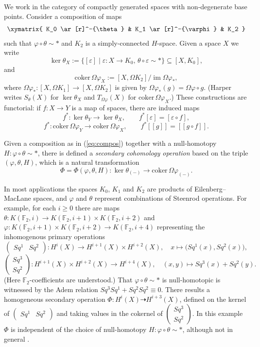\documentclass{amsart}
\theoremstyle{plain}
\theoremstyle{definition}
\def\ker{\operatorname{ker}}
\def\coker{\mathrm{coker}}
\newcommand{\F}{\mathbb{F}}
\begin{document}
We work in the category of compactly generated spaces with non-degenerate base points. Consider a composition of maps
\begin{equation}\label{eq:compos}
\xymatrix{
K_0 \ar[r]^-{\theta} & K_1 \ar[r]^-{\varphi} & K_2
}
\end{equation}
such that $\varphi\circ\theta\sim \ast$ and $K_2$ is a simply-connected $H$-space. Given a space $X$ we write
\[
\ker \theta_X:=\{ [\varepsilon] \mid \varepsilon: X\to K_0,\, \theta\circ\varepsilon \sim \ast\} \subseteq [X, K_0],
\]
and 
\[
\coker\, \Omega\varphi_X:=[X,\Omega K_2]/\operatorname{im} \Omega\varphi_*,
\]
where $\Omega\varphi_* : [X,\Omega K_1] \to [X,\Omega K_2]$ is given by $\Omega\varphi_*(g)=\Omega\varphi\circ g$. (Harper writes $S_\theta(X)$ for $\ker \theta_X$ and $T_{\Omega\varphi}(X)$ for $\coker\,\Omega\varphi_X$.) These constructions are functorial: if $f:X\to Y$ is a map of spaces, there are induced maps
\[
f^*: \ker\theta_Y \to \ker\theta_X,\qquad f^*[\varepsilon]=[\varepsilon\circ f],
\]
\[
f^*: \coker\,\Omega\varphi_Y\to \coker\,\Omega\varphi_X,\qquad f^*[[g]]=[[g\circ f]].
\]

Given a composition as in (\ref{eq:compos}) together with a null-homotopy $H: \varphi\circ\theta \sim \ast$, there is defined a \emph{secondary cohomology operation} based on the triple $(\varphi,\theta,H)$, which is a natural transformation
\[
\Phi=\Phi(\varphi,\theta,H): \ker \theta_{(-)}\to \coker\,\Omega\varphi_{(-)}.
\]
 
In most applications the spaces $K_0$, $K_1$ and $K_2$ are products of Eilenberg--MacLane spaces, and $\varphi$ and $\theta$ represent combinations of Steenrod operations. For example, for each $i\ge0$ there are maps $\theta: K(\F_2,i)\to K(\F_2,i+1)\times K(\F_2,i+2)$ and $\varphi: K(\F_2,i+1)\times K(\F_2,i+2)\to K(\F_2,i+4)$ representing the inhomogenous primary operations 
\[
\begin{pmatrix} Sq^1 & Sq^2 \end{pmatrix}: H^i(X)\to H^{i+1}(X)\times H^{i+2}(X),\quad x\mapsto \big(Sq^1(x), Sq^2(x)\big),
\]
\[
\begin{pmatrix} Sq^3 \\ Sq^2 \end{pmatrix}: H^{i+1}(X)\times H^{i+2}(X) \to H^{i+4}(X), \quad (x,y) \mapsto Sq^3(x) + Sq^2(y).
\]
(Here $\F_2$-coefficients are understood.) That $\varphi\circ\theta\sim \ast$ is null-homotopic is witnessed by the Adem relation $Sq^3Sq^1 + Sq^2Sq^2\equiv 0$. There results a homogeneous secondary operation $\Phi: H^i(X)\dashrightarrow H^{i+3}(X)$, defined on the kernel of $\begin{pmatrix} Sq^1 & Sq^2 \end{pmatrix}$ and taking values in the cokernel of $\begin{pmatrix} Sq^3 \\ Sq^2 \end{pmatrix}$. In this example $\Phi$ is independent of the choice of null-homotopy $H:\varphi\circ\theta\sim\ast$, although not in general \cite[p.\ 89]{Harper}.
\end{document}
